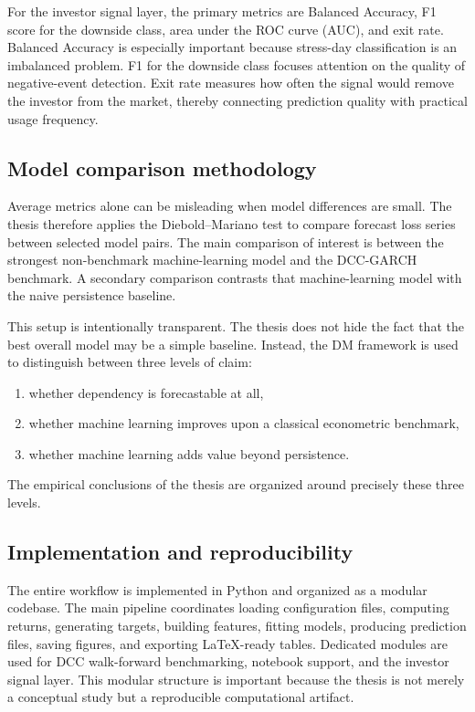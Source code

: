 For the investor signal layer, the primary metrics are Balanced Accuracy, F1 score for the downside class, area under the ROC curve (AUC), and exit rate. Balanced Accuracy is especially important because stress-day classification is an imbalanced problem. F1 for the downside class focuses attention on the quality of negative-event detection. Exit rate measures how often the signal would remove the investor from the market, thereby connecting prediction quality with practical usage frequency.

\subsection{Model comparison methodology}

Average metrics alone can be misleading when model differences are small. The thesis therefore applies the Diebold--Mariano test to compare forecast loss series between selected model pairs. The main comparison of interest is between the strongest non-benchmark machine-learning model and the DCC-GARCH benchmark. A secondary comparison contrasts that machine-learning model with the naive persistence baseline.

This setup is intentionally transparent. The thesis does not hide the fact that the best overall model may be a simple baseline. Instead, the DM framework is used to distinguish between three levels of claim:

\begin{enumerate}
    \item whether dependency is forecastable at all,
    \item whether machine learning improves upon a classical econometric benchmark,
    \item whether machine learning adds value beyond persistence.
\end{enumerate}

The empirical conclusions of the thesis are organized around precisely these three levels.

\subsection{Implementation and reproducibility}

The entire workflow is implemented in Python and organized as a modular codebase. The main pipeline coordinates loading configuration files, computing returns, generating targets, building features, fitting models, producing prediction files, saving figures, and exporting LaTeX-ready tables. Dedicated modules are used for DCC walk-forward benchmarking, notebook support, and the investor signal layer. This modular structure is important because the thesis is not merely a conceptual study but a reproducible computational artifact.


